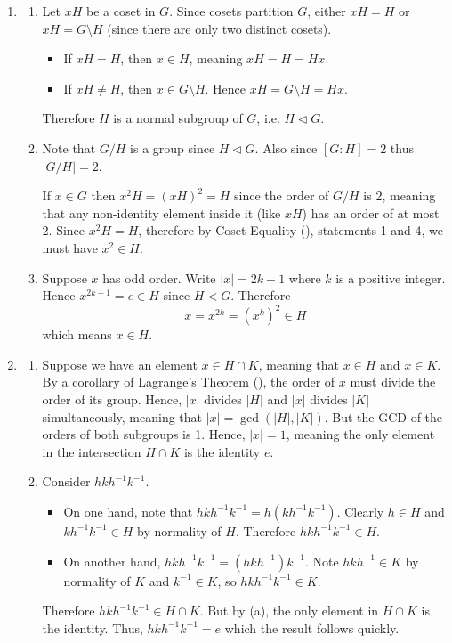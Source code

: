 \begin{enumerate}
    \item \begin{enumerate}[label=(\roman*)]
        \item Let $xH$ be a coset in $G$. Since cosets partition $G$, either $xH = H$ or $xH = G \setminus H$ (since there are only two distinct cosets).
    \begin{itemize}
            \item If $xH = H$, then $x \in H$, meaning $xH = H = Hx$.
            \item If $xH \neq H$, then $x \in G \setminus H$. Hence $xH = G \setminus H = Hx$.
    \end{itemize}
    Therefore $H$ is a normal subgroup of $G$, i.e. $H \lhd G$.
        \item Note that $G/H$ is a group since $H \lhd G$. Also since $[G:H] = 2$ thus $|G/H| = 2$.
        
        If $x \in G$ then $x^2H = (xH)^2 = H$ since the order of $G/H$ is 2, meaning that any non-identity element inside it (like $xH$) has an order of at most 2. Since $x^2H = H$, therefore by Coset Equality (), statements 1 and 4, we must have $x^2 \in H$.
        
        \item Suppose $x$ has odd order. Write $|x| = 2k - 1$ where $k$ is a positive integer. Hence $x^{2k-1} = e \in H$ since $H < G$. Therefore
        \[
            x = x^{2k} = \left(x^k\right)^2 \in H        
        \]
        which means $x \in H$.
    \end{enumerate}

    \item \begin{enumerate}[label=(\alph*)]
        \item Suppose we have an element $x \in H \cap K$, meaning that $x \in H$ and $x \in K$. By a corollary of Lagrange's Theorem (), the order of $x$ must divide the order of its group. Hence, $|x|$ divides $|H|$ and $|x|$ divides $|K|$ simultaneously, meaning that $|x| = \gcd(|H|, |K|)$. But the GCD of the orders of both subgroups is 1. Hence, $|x| = 1$, meaning the only element in the intersection $H \cap K$ is the identity $e$.
        
        \item Consider $hkh^{-1}k^{-1}$.
        \begin{itemize}
            \item On one hand, note that $hkh^{-1}k^{-1} = h(kh^{-1}k^{-1})$. Clearly $h \in H$ and $kh^{-1}k^{-1} \in H$ by normality of $H$. Therefore $hkh^{-1}k^{-1} \in H$.
            \item On another hand, $hkh^{-1}k^{-1} = (hkh^{-1})k^{-1}$. Note $hkh^{-1} \in K$ by normality of $K$ and $k^{-1} \in K$, so $hkh^{-1}k^{-1} \in K$.
        \end{itemize}
        Therefore $hkh^{-1}k^{-1} \in H \cap K$. But by (a), the only element in $H \cap K$ is the identity. Thus, $hkh^{-1}k^{-1} = e$ which the result follows quickly.
    \end{enumerate}
    

\end{enumerate}
